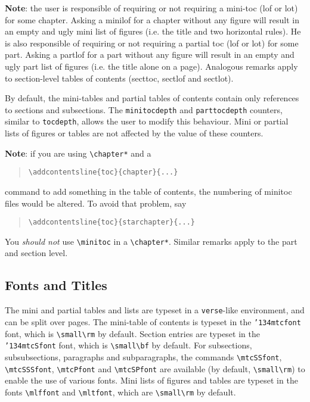 \documentclass[12pt,a4paper]{book}
\newcommand\virage{\marginpar[\raggedleft
 {{\manfnt\symbol{'177}}~~}]{\raggedright {~~\manfnt\symbol{'177}}}}
\def\bs{{\tt\char'134}}
\begin{document}
\noindent
{\bf Note}\virage: the user is responsible of requiring or not requiring
a mini-toc (lof or lot) for some chapter. Asking a minilof for a
chapter without any figure will result in an empty and ugly mini
list of figures (i.e. the title and two horizontal rules).
He is also responsible of requiring or not requiring
a partial toc (lof or lot) for some part. Asking a partlof for a
part without any figure will result in an empty and ugly part
list of figures (i.e. the title alone on a page). Analogous remarks
apply to section-level tables of contents (secttoc, sectlof and sectlot).

By default, the mini-tables and partial tables of contents
contain only references to sections and
subsections. The {\tt minitocdepth} and {\tt parttocdepth}
counters, similar to {\tt tocdepth},
allows the user to modify this behaviour. Mini or partial
lists of figures or tables are not affected by the value of
these counters.

\noindent
{\bf Note}\virage: if you are using \verb|\chapter*| and a
\begin{quote}
\verb|\addcontentsline{toc}{chapter}{...}|
\end{quote}
command to add something in the
table of contents, the numbering of minitoc files would be altered.
To avoid that problem, say
\begin{quote}
\verb|\addcontentsline{toc}{starchapter}{...}|
\end{quote}
You \emph{should not} use \verb|\minitoc| in a \verb|\chapter*|.
Similar remarks apply to the part and section level.

\subsection{Fonts and Titles}

The mini and partial tables and lists are typeset
in a {\tt verse}-like environment, and
can be split over pages.
The mini-table of contents
is typeset in the {\tt\bs mtcfont}
font, which is \verb|\small\rm| by default. Section entries are typeset
in the {\tt\bs mtcSfont} font, which is \verb|\small\bf| by default.
For subsections, subsubsections, paragraphs and subparagraphs, the
commands \verb|\mtcSSfont|, \verb|\mtcSSSfont|, \verb|\mtcPfont| and
\verb|\mtcSPfont| are available (by default, \verb|\small\rm|)
to enable the use of various fonts. Mini lists of figures and tables are
typeset in the fonts \verb|\mlffont| and \verb|\mltfont|, which are
\verb|\small\rm| by default.
\end{document}
